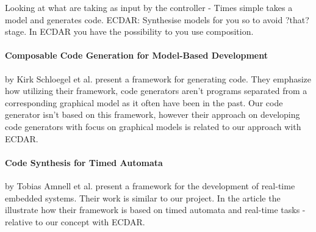 Looking at what are taking as input by the controller - Times simple takes a
model and generates code. ECDAR: Synthesise models for you so to avoid ?that?
stage. In ECDAR you have the possibility to you use composition.



\paragraph{Composable Code Generation for Model-Based Development}
by Kirk Schloegel et al. present a framework for generating
code\cite{composable-code-generation}. They emphasize how utilizing their
framework, code generators aren't programs separated from a corresponding
graphical model as it often have been in the past. Our code generator isn't
based on this framework, however their approach on developing code generators
with focus on graphical models is related to our approach with ECDAR.

\paragraph{Code Synthesis for Timed Automata}
by Tobias Amnell et al. present a framework for the development of real-time
embedded systems\cite{Amnell:2002:CST:779110.779112}. Their work is similar to
our project. In the article the illustrate how their framework is based on timed
automata and real-time tasks - relative to our concept with ECDAR.
